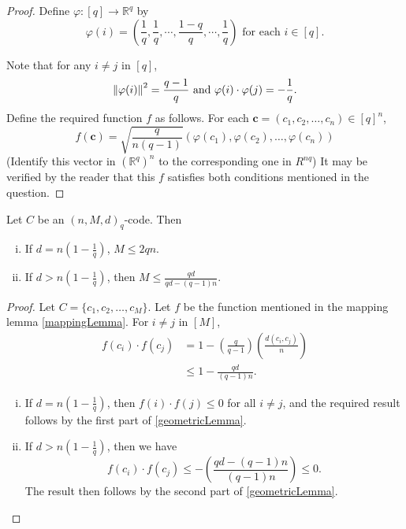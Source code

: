 \begin{proof}
    Define $\varphi:[q]\to\mathbb{R}^q$ by
    $$\varphi(i)=\left(\frac{1}{q},\frac{1}{q},\cdots,\frac{1-q}{q},\cdots,\frac{1}{q}\right) \text{ for each $i\in[q]$}.$$
    
    Note that for any $i\neq j$ in $[q]$,
    $$\left\lVert\varphi(i)\right\rVert^2=\frac{q-1}{q}
    \text{ and }
    \varphi(i)\cdot\varphi(j)=-\frac{1}{q}.$$
    Define the required function $f$ as follows. For each $\textbf{c}=(c_1,c_2,\ldots,c_n)\in [q]^n$,
    $$f(\textbf{c})=\sqrt{\frac{q}{n(q-1)}}(\varphi(c_1),\varphi(c_2),\ldots,\varphi(c_n))$$
    (Identify this vector in $(\mathbb{R}^q)^n$ to the corresponding one in $R^{nq}$) It may be verified by the reader that this $f$ satisfies both conditions mentioned in the question.
\end{proof}

\begin{theorem}
    Let $C$ be an $(n,M,d)_q$-code. Then
    \begin{enumerate}[(i)]
        \item If $d= n\left(1-\frac{1}{q}\right)$, $M\leq 2qn$.
        \item If $d> n\left(1-\frac{1}{q}\right)$, then $M\leq \frac{qd}{qd-(q-1)n}$.
    \end{enumerate}
\end{theorem}
\begin{proof}
    Let $C=\{c_1,c_2,\ldots,c_M\}$. Let $f$ be the function mentioned in the mapping lemma \ref{mappingLemma}. For $i\neq j$ in $[M]$,
    \begin{align*}
        f(c_i)\cdot f(c_j) &= 1 - \left(\frac{q}{q-1}\right)\left(\frac{d(c_i,c_j)}{n}\right) \\
                           &\leq 1 - \frac{qd}{(q-1)n}.
    \end{align*}
    
    \begin{enumerate}[(i)]
        \item If $d=n(1-\frac{1}{q})$, then $f(i)\cdot f(j)\leq 0$ for all $i\neq j$, and the required result follows by the first part of \ref{geometricLemma}.
        
        \item If $d>n(1-\frac{1}{q})$, then we have
        $$f(c_i)\cdot f(c_j) \leq -\left(\frac{qd-(q-1)n}{(q-1)n}\right) \leq 0.$$
        The result then follows by the second part of \ref{geometricLemma}.
    \end{enumerate}
\end{proof}

